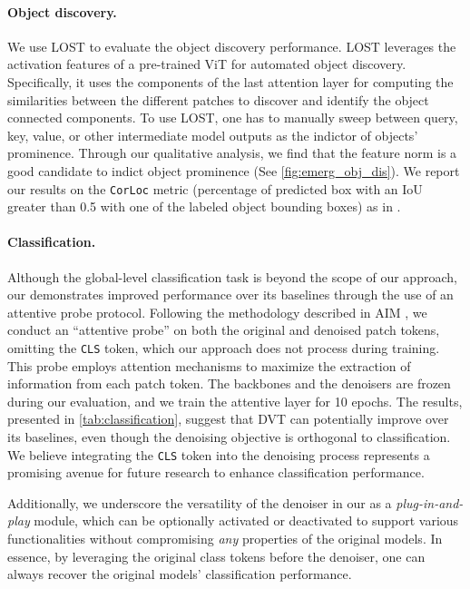 \paragraph{Object discovery.} We use LOST \cite{simeoni2021localizing} to evaluate the object discovery performance.
LOST leverages the activation features of a pre-trained ViT for automated object discovery. Specifically, it uses the components of the last attention layer for computing the similarities between the different patches to discover and identify the object connected components.
To use LOST, one has to manually sweep between query, key, value, or other intermediate model outputs as the indictor of objects' prominence. Through our qualitative analysis, we find that the feature norm is a good candidate to indict object prominence (See \cref{fig:emerg_obj_dis}). We report our results on the \texttt{CorLoc} metric (percentage of predicted box with an IoU greater than 0.5 with one of the labeled object bounding boxes) as in \cite{simeoni2021localizing,darcet2023vision}.

\paragraph{Classification.} Although the global-level classification task is beyond the scope of our approach, our \ours demonstrates improved performance over its baselines through the use of an attentive probe protocol. Following the methodology described in AIM \cite{el2024scalable}, we conduct an ``attentive probe'' on both the original and denoised patch tokens, omitting the \texttt{CLS} token, which our approach does not process during training. This probe employs attention mechanisms to maximize the extraction of information from each patch token. The backbones and the denoisers are frozen during our evaluation, and we train the attentive layer for 10 epochs. The results, presented in \cref{tab:classification}, suggest that DVT can potentially improve over its baselines, even though the denoising objective is orthogonal to classification. We believe integrating the \texttt{CLS} token into the denoising process represents a promising avenue for future research to enhance classification performance.

Additionally, we underscore the versatility of the denoiser in our \ours as a \textit{plug-in-and-play} module, which can be optionally activated or deactivated to support various functionalities without compromising \textit{any} properties of the original models. In essence, by leveraging the original class tokens before the denoiser, one can always recover the original models' classification performance.

